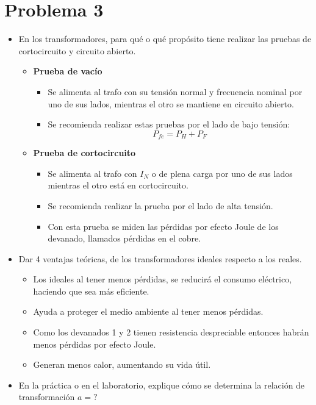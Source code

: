 \documentclass[a4paper,11pt]{article}
\begin{document}
\section*{Problema 3}
\begin{itemize}
    \item En los transformadores, para qué o qué propósito tiene realizar las pruebas de cortocircuito y circuito abierto.
    \begin{itemize}
        \item \textbf{Prueba de vacío}
        \begin{itemize}
            \item Se alimenta al trafo con su tensión normal y frecuencia nominal por uno de sus lados, mientras el otro se mantiene en circuito abierto.
            \item Se recomienda realizar estas pruebas por el lado de bajo tensión:
            $$
            P_{fe} = P_{H} + P_{F}
            $$
        \end{itemize}
        \item \textbf{Prueba de cortocircuito}
        \begin{itemize}
            \item Se alimenta al trafo con $I_{N}$ o de plena carga por uno de sus lados mientras el otro está en cortocircuito.
            \item Se recomienda realizar la prueba por el lado de alta tensión.
            \item Con esta prueba se miden las pérdidas por efecto Joule de los devanado, llamados pérdidas en el cobre.
        \end{itemize}
    \end{itemize}
    \item Dar 4 ventajas teóricas, de los transformadores ideales respecto a los reales.
    \begin{itemize}
        \item Los ideales al tener menos pérdidas, se reducirá el consumo eléctrico, haciendo que sea más eficiente.
        \item Ayuda a proteger el medio ambiente al tener menos pérdidas.
        \item Como los devanados 1 y 2 tienen resistencia despreciable entonces habrán menos pérdidas por efecto Joule.
        \item Generan menos calor, aumentando su vida útil.
    \end{itemize}
    \item En la práctica o en el laboratorio, explique cómo se determina la relación de transformación $a = ?$\\

\end{itemize}
\end{document}
